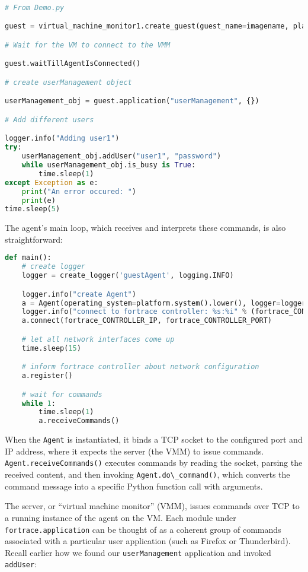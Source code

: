\documentclass[letterpaper,12pt]{report}
\newcommand{\passthrough}[1]{#1}
\begin{document}
\begin{lstlisting}[language=Python]

# From Demo.py

guest = virtual_machine_monitor1.create_guest(guest_name=imagename, platform="windows")

# Wait for the VM to connect to the VMM

guest.waitTillAgentIsConnected()

# create userManagement object

userManagement_obj = guest.application("userManagement", {})

# Add different users

logger.info("Adding user1")
try:
    userManagement_obj.addUser("user1", "password")
    while userManagement_obj.is_busy is True:
        time.sleep(1)
except Exception as e:
    print("An error occured: ")
    print(e)
time.sleep(5)
\end{lstlisting}

The agent's main loop, which receives and interprets these commands, is
also straightforward:

\begin{lstlisting}[language=Python]
def main():
    # create logger
    logger = create_logger('guestAgent', logging.INFO)

    logger.info("create Agent")
    a = Agent(operating_system=platform.system().lower(), logger=logger)
    logger.info("connect to fortrace controller: %s:%i" % (fortrace_CONTROLLER_IP, fortrace_CONTROLLER_PORT))
    a.connect(fortrace_CONTROLLER_IP, fortrace_CONTROLLER_PORT)

    # let all network interfaces come up
    time.sleep(15)

    # inform fortrace controller about network configuration
    a.register()

    # wait for commands
    while 1:
        time.sleep(1)
        a.receiveCommands()
\end{lstlisting}

When the \passthrough{\lstinline!Agent!} is instantiated, it binds a TCP
socket to the configured port and IP address, where it expects the
server (the VMM) to issue commands.
\passthrough{\lstinline!Agent.receiveCommands()!} executes commands by
reading the socket, parsing the received content, and then invoking
\passthrough{\lstinline!Agent.do\_command()!}, which converts the
command message into a specific Python function call with arguments.

The server, or ``virtual machine monitor'' (VMM), issues commands over
TCP to a running instance of the agent on the VM. Each module under
\passthrough{\lstinline!fortrace.application!} can be thought of as a
coherent group of commands associated with a particular user application
(such as Firefox or Thunderbird). Recall earlier how we found our
\passthrough{\lstinline!userManagement!} application and invoked
\passthrough{\lstinline!addUser!}:
\end{document}

